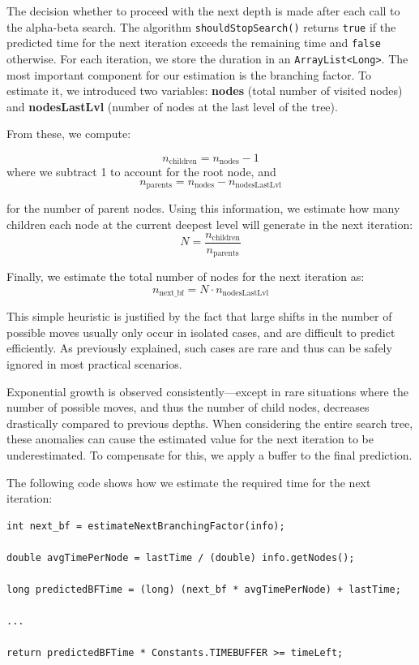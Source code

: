 \noindent The decision whether to proceed with the next depth is made after each call to the alpha-beta search. The algorithm \texttt{shouldStopSearch()} returns \texttt{true} if the predicted time for the next iteration exceeds the remaining time and \texttt{false} otherwise. For each iteration, we store the duration in an \texttt{ArrayList<Long>}. The most important component for our estimation is the branching factor. To estimate it, we introduced two variables: \textbf{nodes} (total number of visited nodes) and \textbf{nodesLastLvl} (number of nodes at the last level of the tree).

From these, we compute:

$$n_{\text{children}} = n_{\text{nodes}} - 1$$
where we subtract 1 to account for the root node, and
$$n_{\text{parents}} = n_{\text{nodes}} - n_{\text{nodesLastLvl}}$$

for the number of parent nodes. Using this information, we estimate how many children each node at the current deepest level will generate in the next iteration:
$$N = \frac{n_{\text{children}}}{n_{\text{parents}}}$$

Finally, we estimate the total number of nodes for the next iteration as:
$$n_{\text{next\_bf}} = N \cdot n_{\text{nodesLastLvl}}$$

\noindent This simple heuristic is justified by the fact that large shifts in the number of possible moves usually only occur in isolated cases, and are difficult to predict efficiently. As previously explained, such cases are rare and thus can be safely ignored in most practical scenarios.

\noindent Exponential growth is observed consistently—except in rare situations where the number of possible moves, and thus the number of child nodes, decreases drastically compared to previous depths. When considering the entire search tree, these anomalies can cause the estimated value for the next iteration to be underestimated. To compensate for this, we apply a buffer to the final prediction.

\noindent The following code shows how we estimate the required time for the next iteration:

\begin{lstlisting}
int next_bf = estimateNextBranchingFactor(info);

double avgTimePerNode = lastTime / (double) info.getNodes();

long predictedBFTime = (long) (next_bf * avgTimePerNode) + lastTime;

...

return predictedBFTime * Constants.TIMEBUFFER >= timeLeft;
\end{lstlisting}

